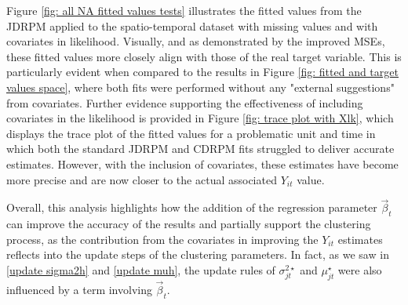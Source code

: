 \documentclass[12pt,	%
	a4paper,		%
	twoside,		%
	openright,		%
	titlepage,%
	]{book}
\theoremstyle{definition}
\begin{document}
Figure \ref{fig: all NA fitted values tests} illustrates the fitted values from the JDRPM applied to the spatio-temporal dataset with missing values and with covariates in likelihood. Visually, and as demonstrated by the improved MSEs, these fitted values more closely align with those of the real target variable. This is particularly evident when compared to the results in Figure \ref{fig: fitted and target values space}, where both fits were performed without any "external suggestions" from covariates.
Further evidence supporting the effectiveness of including covariates in the likelihood is provided in Figure \ref{fig: trace plot with Xlk}, which displays the trace plot of the fitted values for a problematic unit and time in which both the standard JDRPM and CDRPM fits struggled to deliver accurate estimates. However, with the inclusion of covariates, these estimates have become more precise and are now closer to the actual associated $Y_{it}$ value.\nowidow

Overall, this analysis highlights how the addition of the regression parameter $\vec{\beta}_t$ can improve the accuracy of the results and partially support the clustering process, as the contribution from the covariates in improving the $Y_{it}$ estimates reflects into the update steps of the clustering parameters. In fact, as we saw in \eqref{update sigma2h} and \eqref{update muh}, the update rules of $\sigma^{2\star}_{jt}$ and $\mu^\star_{jt}$ were also influenced by a term involving $\vec{\beta}_t$. 

\end{document}
